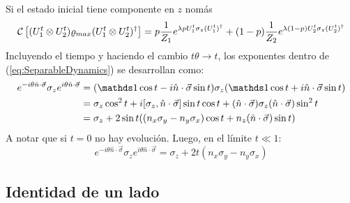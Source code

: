 Si el estado inicial tiene componente en $z$ nomás
\begin{equation}\label{eq:SeparableZDynamics}
\mathcal{C}\left[(U_{1}^{t}\otimes U_{2}^{t})\varrho_{max}(U_{1}^{t}\otimes U_{2}^{t})^{\dag}\right]=p\frac{1}{Z_{1}}e^{\lambda p U_{1}^{t}\sigma_{z}(U_{1}^t)^{\dag}}+(1-p)\frac{1}{Z_{2}}e^{\lambda (1-p)U_{2}^{t}\sigma_{z}(U_{2}^t)^{\dag}}
\end{equation}
Incluyendo el tiempo y haciendo el cambio $t\theta\rightarrow t$, los exponentes dentro de (\ref{eq:SeparableDynamics}) se desarrollan como:
\begin{align*}
    e^{-i\theta \hat{n}\cdot\vec{\sigma}}\sigma_{z}e^{i\theta \hat{n}\cdot\vec{\sigma}}&=(\Id\cos{t}-i\hat{n}\cdot\vec{\sigma}\sin{t})\sigma_{z}(\Id\cos{t}+i\hat{n}\cdot\vec{\sigma}\sin{t})\\
    &=\sigma_{z}\cos^{2}{t}+i[\sigma_{z},\hat{n}\cdot\vec{\sigma}]\sin{t}\cos{t}+(\hat{n}\cdot\vec{\sigma})\sigma_{z}(\hat{n}\cdot\vec{\sigma})\sin^{2}{t}\\
    &=\sigma_{z}+2\sin{t}\qty((n_{x}\sigma_{y}-n_{y}\sigma_{x})\cos{t}+n_{z}(\hat{n}\cdot\vec{\sigma})\sin{t})
\end{align*}
A notar que si $t=0$ no hay evolución. Luego, en el límite $t\ll 1$:
\begin{equation*}
    e^{-i\theta \hat{n}\cdot\vec{\sigma}}\sigma_{z}e^{i\theta \hat{n}\cdot\vec{\sigma}}=\sigma_{z}+2t(n_{x}\sigma_{y}-n_{y}\sigma_{x})
\end{equation*}


\subsection{Identidad de un lado}

